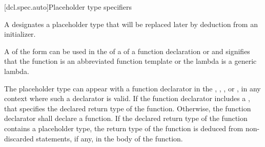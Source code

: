 [dcl.spec.auto]{Placeholder type specifiers}%
%

\begin{bnf}
\br
   \br
    \terminal{(}  \terminal{)}
\end{bnf}

\pnum
A 
designates a placeholder type that will be replaced later by deduction
from an initializer.

\pnum
A  of the form
 
can be used in the  of
a  of
a function declaration or  and
signifies that the function is
an abbreviated function template or
the lambda is a generic lambda.

\pnum
The placeholder type can appear with a function declarator in the
, ,
, or ,
in any context where such a declarator is valid. If the function declarator
includes a , that
 specifies
the declared return type of the function. Otherwise, the function declarator
shall declare a function. If the declared return type of the
function contains a placeholder type, the return type of the function is
deduced from non-discarded  statements, if any, in the body
of the function.

